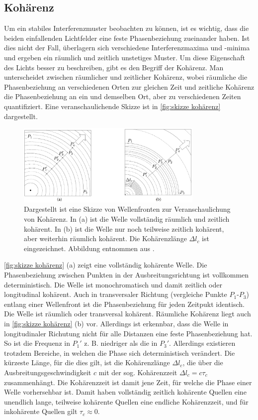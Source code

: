 \subsection{Kohärenz}
\label{ssec:Kohärenz}
Um ein stabiles Interferenzmuster beobachten zu können, ist es wichtig, dass die beiden einfallenden Lichtfelder eine feste Phasenbeziehung zueinander haben. 
Ist dies nicht der Fall, überlagern sich verschiedene Interferenzmaxima und -minima und ergeben ein räumlich und zeitlich unstetiges Muster. 
Um diese Eigenschaft des Lichts besser zu beschreiben, gibt es den Begriff der Kohärenz.
Man unterscheidet zwischen räumlicher und zeitlicher Kohärenz, wobei räumliche die Phasenbeziehung an verschiedenen Orten zur gleichen Zeit und zeitliche Kohärenz die Phasenbeziehung an ein und demselben Ort, aber zu verschiedenen Zeiten quantifiziert. \cite[Kap. 9.2]{hechtOptik2018}
Eine veranschaulichende Skizze ist in \autoref{fig:skizze kohärenz} dargestellt.
\begin{figure}[h]
    \centering
    \includegraphics[width=0.8\textwidth]{images/Theorie/Hecht_9.6.png}
    \caption{Dargestellt ist eine Skizze von Wellenfronten zur Veranschaulichung von Kohärenz. In (a) ist die Welle vollständig räumlich und zeitlich kohärent. In (b) ist die Welle nur noch teilweise zeitlich kohärent, aber weiterhin räumlich kohärent. Die Kohärenzlänge $\Delta l_c$ ist eingezeichnet. Abbildung entnommen aus \cite{hechtOptik2018}.}
    \label{fig:skizze kohärenz}
\end{figure}
\autoref{fig:skizze kohärenz} (a) zeigt eine vollständig kohärente Welle. 
Die Phasenbeziehung zwischen Punkten in der Ausbreitungsrichtung ist vollkommen deterministisch. 
Die Welle ist monochromatisch und damit zeitlich oder longitudinal kohärent. 
Auch in transversaler Richtung (vergleiche Punkte $P_1$-$P_3$) entlang einer Wellenfront ist die Phasenbeziehung für jeden Zeitpukt identisch. 
Die Welle ist räumlich oder transversal kohärent. 
Räumliche Kohärenz liegt auch in \autoref{fig:skizze kohärenz} (b) vor. 
Allerdings ist erkennbar, dass die Welle in longitudinaler Richutung nicht für alle Distanzen eine feste Phasenbeziehung hat. 
So ist die Frequenz in $P_1'$ z. B. niedriger als die in $P_3'$. 
Allerdings existieren trotzdem Bereiche, in welchen die Phase sich deterministisch verändert. 
Die kürzeste Länge, für die dies gilt, ist die Kohärenzlänge $\Delta l_c$, die über die Ausbreitungsgeschwindigkeit $c$ mit der sog. Kohärenzzeit $\Delta l_c = c\tau_c$ zusammenhängt. 
Die Kohärenzzeit ist damit jene Zeit, für welche die Phase einer Welle vorhersehbar ist. 
Damit haben vollständig zeitlich kohärente Quellen eine unendlich lange, teilweise kohärente Quellen eine endliche Kohärenzzeit, und für inkohärente Quellen gilt $\tau_c\approx 0$. 

